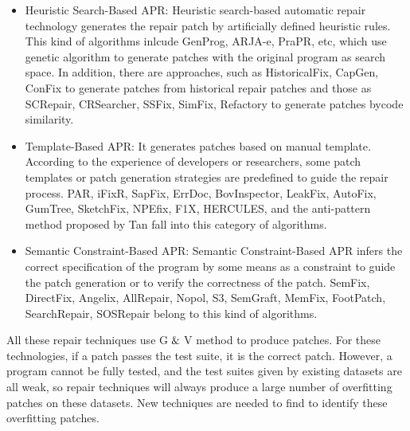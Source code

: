 \documentclass[sn-basic]{sn-jnl}
\theoremstyle{thmstyleone}
\theoremstyle{thmstyletwo}
\theoremstyle{thmstylethree}
\begin{document}
\begin{itemize}
	\item Heuristic Search-Based APR: Heuristic search-based automatic repair technology generates the repair patch by artificially defined heuristic rules. This kind of algorithms inlcude GenProg, ARJA-e\citep{bib11,bib14}, PraPR\citep{bib9}, etc, which use genetic algorithm to generate patches with the original program as search space. In addition, there are approaches, such as HistoricalFix\citep{bib15}, CapGen\citep{bib16}, ConFix\citep{bib17} to generate patches from historical repair patches and those as SCRepair\citep{bib18}, CRSearcher\citep{bib19}, SSFix\citep{bib20}, SimFix\citep{bib21}, Refactory\citep{bib22} to generate patches bycode similarity.
	
	\item Template-Based APR: It generates patches based on manual template.  According to the experience of developers or researchers, some patch templates or patch generation strategies are predefined to guide the repair process. PAR\citep{bib74}, iFixR\citep{bib24}, SapFix\citep{bib25}, ErrDoc\citep{bib26}, BovInspector\citep{bib27}, LeakFix\citep{bib28}, AutoFix\citep{bib29}, GumTree\citep{bib30}, SketchFix\citep{bib31}, NPEfix\citep{bib32}, F1X\citep{bib33}, HERCULES\citep{bib34}, and the anti-pattern method proposed by Tan\citep{bib35} fall into this category of algorithms.
	\item Semantic Constraint-Based APR: Semantic Constraint-Based APR infers the correct specification of the program by some means as a constraint to guide the patch generation or to verify the correctness of the patch. SemFix\cite{bib36}, DirectFix\citep{bib37}, Angelix\citep{bib38}, AllRepair\citep{bib39}, Nopol\citep{bib40}, S3\citep{bib41}, SemGraft\citep{bib42}, MemFix\citep{bib43}, FootPatch\citep{bib44}, SearchRepair\citep{bib45}, SOSRepair\citep{bib46} belong to this kind of algorithms.
\end{itemize}

All these repair techniques use G$\And$V method to produce patches. For these technologies, if a patch passes the test suite, it is the correct patch. However, a program cannot be fully tested, and the test suites given by existing datasets are all weak\citep{bib10}, so repair techniques will always produce a large number of overfitting patches on these datasets. New techniques are needed to find to identify these overfitting patches.
\end{document}
